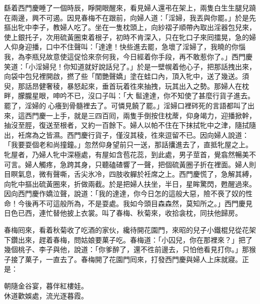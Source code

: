 繇着西門慶睡了一個時辰，睜開眼醒來，看見婦人還弔在架上，兩隻白生生腿兒蹺在兩邊，興不可遏。{}因見春梅不在跟前，向婦人道：「淫婦，我丟與你罷。」{}於是先摳出牝中李子，教婦人吃了。{}坐在一隻枕頭上，向紗褶子順帶內取出淫器包兒來，使上銀托子，次用硫黃圈束着根子，初時不肯深入，只在牝口子來囘擂晃，急的婦人仰身迎播，口中不住聲叫：「達達！快些進去罷，急壞了淫婦了，我曉的你惱我，為李瓶兒故意使這促恰來奈何我，今日經着你手段，再不敢惹你了。」{}西門慶笑道：「小淫婦兒！你知道就好說話兒了。」於是一壁幌着他心子，把那話拽出來，向袋中包兒裡開啟，撚了些「閨艷聲嬌」塗在蛙口內，頂入牝中，送了幾送。須臾，那話昂健奢稜，暴怒起來，垂首玩着徃來抽拽，玩其出入之勢。那婦人在枕畔，朦朧星眼，呻吟不已，沒口子叫：「大𩫻䯲達達，你不知使了甚麼行貨子進去。罷了，淫婦的𣭈心癢到骨髓裡去了。可憐見饒了罷。」淫婦口裡硶死的言語都叫了出來，這西門慶一上手，就是三四百囘，兩隻手倒按住枕蓆，仰身竭力，迎播掀幹，抽沒至脛，復送至根者，又約一百餘下。婦人以帕不住在下抹拭牝中之津，隨拭隨出，衽席為之皆濕。西門慶行貨子，僅沒其稜，徃來逗留不已。因向婦人說道：「我要耍個老和尚撞鐘。」忽然仰身望前只一送，那話攮進去了，直抵牝屋之上。牝屋者，乃婦人牝中深極處，有屋如含苞花蕊，到此處，男子莖首，覺翕然暢美不可言。婦人觸疼，急跨其身，只聽磕碴響了一聲，把個硫黃圈子折在裡面。婦人則目瞑氣息，微有聲嘶，舌尖氷冷，四肢收軃於衽席之上。西門慶慌了，急解其縛，向牝中摳出硫黃圈來，折做兩截。於是把婦人扶坐，半日，星眸驚閃，甦醒過來。因向西門慶作嬌泣聲，{}說道：「我的達達，你今日怎的這般大惡，險不䘮了奴的性命！今後再不可這般所為，不是耍處。我如今頭目森森然，莫知所之。」{}西門慶見日色已西，連忙替他披上衣裳。叫了春梅、秋菊來，收拾衾枕，同扶他歸房。

春梅囘來，看着秋菊收了吃酒的家伙，纔待開花園門，來昭的兒子小鐵棍兒從花架下鑽出來，趕着春梅，問姑娘要菓子吃。春梅道：「小囚兒，你在那裡來？」把了幾個桃子、李子與他，說道：「你爹醉了，還不徃前邊去，只怕他看見打你。」那猴子接了菓子，一直去了。春梅開了花園門囘來，打發西門慶與婦人上床就寢。正是：

\begin{myquote}
朝隨金谷宴，暮伴紅樓娃。\\休道歡娛處，流光逐暮霞。
\end{myquote}

